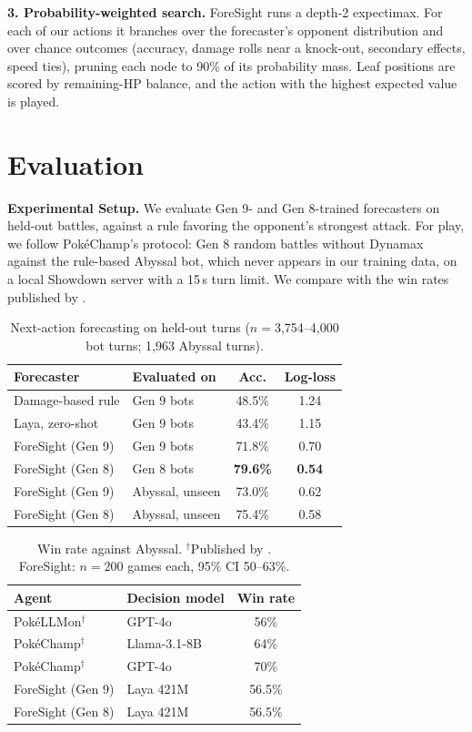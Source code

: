 \documentclass[letterpaper]{article} %
\begin{document}
\textbf{3. Probability-weighted search.} ForeSight runs a depth-2 expectimax. For each of our actions it branches over the forecaster's opponent distribution and over chance outcomes (accuracy, damage rolls near a knock-out, secondary effects, speed ties), pruning each node to 90\% of its probability mass. Leaf positions are scored by remaining-HP balance, and the action with the highest expected value is played.

\section{Evaluation}
\textbf{Experimental Setup.} We evaluate Gen 9- and Gen 8-trained forecasters on held-out battles, against a rule favoring the opponent's strongest attack. For play, we follow PokéChamp's protocol: Gen 8 random battles without Dynamax against the rule-based Abyssal bot, which never appears in our training data, on a local Showdown server with a 15\,s turn limit. We compare with the win rates published by \citet{pokechamp}.

\begin{table}[t]
\centering
\small
\begin{tabular}{llcc}
\toprule
Forecaster & Evaluated on & Acc. & Log-loss \\
\midrule
Damage-based rule & Gen 9 bots & 48.5\% & 1.24 \\
Laya, zero-shot & Gen 9 bots & 43.4\% & 1.15 \\
ForeSight (Gen 9) & Gen 9 bots & 71.8\% & 0.70 \\
ForeSight (Gen 8) & Gen 8 bots & \textbf{79.6\%} & \textbf{0.54} \\
\midrule
ForeSight (Gen 9) & Abyssal, unseen & 73.0\% & 0.62 \\
ForeSight (Gen 8) & Abyssal, unseen & 75.4\% & 0.58 \\
\bottomrule
\end{tabular}
\caption{Next-action forecasting on held-out turns ($n{=}$3,754--4,000 bot turns; 1,963 Abyssal turns).}
\label{tab:forecast}
\end{table}

\begin{table}[t]
\centering
\small
\begin{tabular}{llc}
\toprule
Agent & Decision model & Win rate \\
\midrule
PokéLLMon$^\dagger$ & GPT-4o & 56\% \\
PokéChamp$^\dagger$ & Llama-3.1-8B & 64\% \\
PokéChamp$^\dagger$ & GPT-4o & 70\% \\
\midrule
ForeSight (Gen 9) & Laya 421M & 56.5\% \\
ForeSight (Gen 8) & Laya 421M & 56.5\% \\
\bottomrule
\end{tabular}
\caption{Win rate against Abyssal. $^\dagger$Published by \citet{pokechamp}. ForeSight: $n{=}200$ games each, 95\% CI 50--63\%.}
\label{tab:play}
\end{table}
\end{document}

